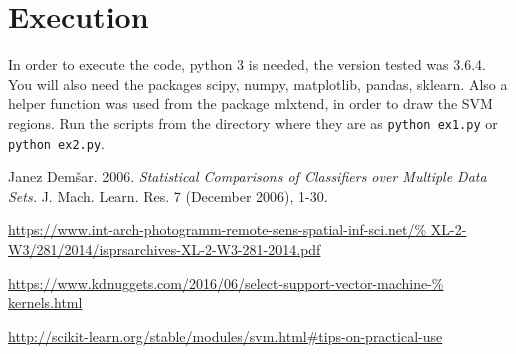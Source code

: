 \documentclass[a4paper]{article}
\begin{document}
%


\section{Execution}
%
%

In order to execute the code, python 3 is needed, the version tested was 3.6.4.  
You will also need the packages scipy, numpy, matplotlib, pandas, sklearn. Also 
a helper function was used from the package mlxtend, in order to draw the SVM 
regions. Run the scripts from the directory where they are as \texttt{python 
ex1.py} or \texttt{python ex2.py}.

\begin{thebibliography}{9}

Janez Demšar. 2006. \textsl{Statistical Comparisons of Classifiers over Multiple 
Data Sets.} J. Mach. Learn. Res. 7 (December 2006), 1-30.

\url{https://www.int-arch-photogramm-remote-sens-spatial-inf-sci.net/%
XL-2-W3/281/2014/isprsarchives-XL-2-W3-281-2014.pdf}

\url{https://www.kdnuggets.com/2016/06/select-support-vector-machine-%
kernels.html}

\url{http://scikit-learn.org/stable/modules/svm.html#tips-on-practical-use}

\end{thebibliography}
\end{document}
